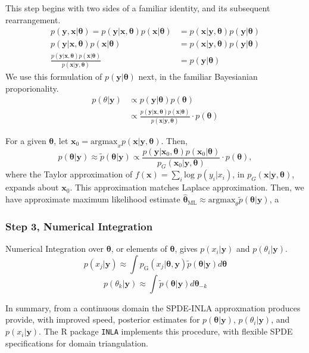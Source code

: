 \documentclass{article}
\begin{document}
This step begins with two sides of a familiar identity, and its subsequent rearrangement.
\begin{align}
p(\pmb{y} , \pmb{x} | \pmb{\theta}) = p(\pmb{y} | \pmb{x}, \pmb{\theta}) p(\pmb{x} | \pmb{\theta})  &= p(\pmb{x} | \pmb{y}, \pmb{\theta}) p(\pmb{y} | \pmb{\theta}) \\
p(\pmb{y} | \pmb{x}, \pmb{\theta}) p(\pmb{x} | \pmb{\theta}) &= p(\pmb{x} | \pmb{y}, \pmb{\theta}) p(\pmb{y} | \pmb{\theta}) \\
\frac{p(\pmb{y} | \pmb{x}, \pmb{\theta}) p(\pmb{x} | \pmb{\theta})} {p(\pmb{x} | \pmb{y}, \pmb{\theta})} &= p(\pmb{y} | \pmb{\theta})  
\end{align}
We use this formulation of $p(\pmb{y} | \pmb{\theta})$ next, in the familiar Bayesianian proporionality.
\begin{align}
p(\theta|\pmb{y}) & \propto p(\pmb{y}|\pmb{\theta})p(\pmb{\theta}) \\
& \propto \frac{p(\pmb{y} | \pmb{x}, \pmb{\theta}) p(\pmb{x} | \pmb{\theta})}{p(\pmb{x} | \pmb{y}, \pmb{\theta})} \cdot p(\pmb{\theta})
\end{align}

For a given $\pmb{\theta}$, let $\pmb{x}_{0} = \text{argmax}_{x}p(\pmb{x}|\pmb{y},\pmb{\theta})$. Then,
$$ p(\pmb{\theta}|\pmb{y}) \approx \tilde{p}(\pmb{\theta}|\pmb{y}) \propto  \frac{p(\pmb{y} | \pmb{x}_{0}, \pmb{\theta}) p(\pmb{x}_{0} | \pmb{\theta})}{p_{G}(\pmb{x}_{0} | \pmb{y}, \pmb{\theta})} \cdot p(\pmb{\theta}),$$
where the Taylor approximation of $f(\pmb{x}) = \sum_{i} \text{log }p(y_{i}|x_{i})$, in $p_{G}(\pmb{x} | \pmb{y}, \pmb{\theta})$, expands about $\pmb{x}_{0}$. This approximation matches \cite{Tierney1986} Laplace approximation.  Then, we have approximate maximum likelihood estimate $\hat{\pmb{\theta}}_{\text{ML}} \approx \text{argmax}_{\theta} \tilde{p}(\pmb{\theta}|\pmb{y})$, a

\subsubsection*{Step 3, Numerical Integration} %
Numerical Integration over $\pmb{\theta}$, or elements of $\pmb{\theta}$, gives $p(x_{i}|\pmb{y})$ and $p(\theta_{i}|\pmb{y})$.
        $$ p(x_{j} | \pmb{y}) \approx \int p_{\text{G}}(x_{j}|\pmb{\theta, y})\tilde{p}(\pmb{\theta}|\pmb{y}) d\pmb{\theta} $$
        $$ p(\theta_{k} | \pmb{y}) \approx \int \tilde{p}(\pmb{\theta}|\pmb{y}) d\pmb{\theta}_{-k} $$

In summary, from a continuous domain the SPDE-INLA approxmation produces provide, with improved speed, posterior estimates for $p(\pmb{\theta}|\pmb{y})$, $p(\theta_{i}|\pmb{y})$, and $p(x_{i}|\pmb{y})$. The R package \verb|INLA| implements this procedure, with flexible SPDE specifications for domain triangulation.
\end{document}
